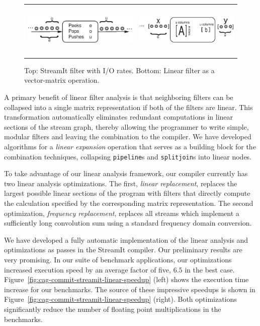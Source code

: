 \begin{figure}
\center
\begin{tabular}{cc}
  \includegraphics[height=1in]{cag-commit-streamit-linear-filter.eps} &
  \includegraphics[height=1in]{cag-commit-streamit-linear-matrix.eps} \\
\end{tabular}
\caption{
  Top: StreamIt filter with I/O rates. 
  Bottom: Linear filter as a vector-matrix operation.
}
\label{fig:overview}
\end{figure}

A primary benefit of linear filter analysis is that neighboring
filters can be collapsed into a single matrix representation if both
of the filters are linear.  This transformation automatically
eliminates redundant computations in linear sections of the stream
graph, thereby allowing the programmer to write simple, modular
filters and leaving the combination to the compiler.  We have 
developed algorithms for a {\it linear expansion} operation that serves as a
building block for the combination techniques, collapsing {\tt pipeline}s 
and {\tt splitjoin}s into linear nodes.

To take advantage of our linear analysis framework, our compiler currently 
has two linear analysis optimizations. The first, {\it linear replacement}, 
replaces the largest possible linear sections of the program with filters 
that directly compute the calculation specified by the corresponding 
matrix representation. The second optimization, {\it frequency replacement}, 
replaces all streams which implement a sufficiently long convolution sum
using a standard frequency domain conversion.


We have developed a fully automatic implementation of the linear analysis 
and optimizations as passes in the StreamIt compiler. Our preliminary results
are very promising. In our suite of benchmark applications, our optimizations
increased execution speed by an average factor of five, $6.5$ in the best 
case. Figure~\ref{fig:cag-commit-streamit-linear-speedup} (left) shows
the execution time increase for our benchmarks. The source of these impressive
speedups is shown in Figure~\ref{fig:cag-commit-streamit-linear-speedup}
(right). Both optimizations significantly reduce the number of floating point multiplications
in the benchmarks. 

